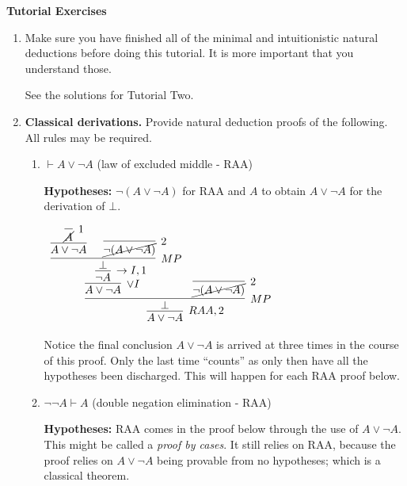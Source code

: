 \documentclass[11pt]{report}
\begin{document}
\newpage
{\bf Tutorial Exercises}
\begin{enumerate}

	\item Make sure you have finished all of the minimal and intuitionistic natural deductions before doing this tutorial. It is more important that you understand those.
	
	\hspace{0.2cm}{\bf Solution}
	
	See the solutions for Tutorial Two. 

	\item \textbf{Classical derivations.} Provide natural deduction proofs of the following. All rules may be required.
	
	\begin{enumerate}
		\item $\vdash   A \lor \neg A$ \hfill (law of excluded middle - RAA)
		
		\hspace{0.2cm}{\bf Solution}

		{\bf Hypotheses:} $\lnot(A \lor \lnot A)$ for RAA and $A$ to obtain $A \lor \lnot A$ for the derivation of $\bot$. 

		\begin{mdframed}
			\begin{center}
				$\begin{array}{c}
					\infer[RAA,2]{A \lor \lnot A}
						{\infer[MP]{\bot}
							{\infer[\lor I]{A \lor \lnot A}
								{\infer[\to I,1]{\lnot A}
									{\infer[MP]{\bot}
										{\infer[]{A \lor \lnot A}{\infer[1]{\cancel{A}}{}}
										&
										\infer[2]{\cancel{\lnot (A \lor \lnot A)}}{}}}}
							&
							\infer[2]{\cancel{\lnot(A \lor \lnot A)}}{}}}
				\end{array}$
			\end{center}
		\end{mdframed}

		Notice the final conclusion $A \lor \lnot A$ is arrived at three times in the course of this proof. Only the last time ``counts'' as only then have all the hypotheses been discharged. This will happen for each RAA proof below. 

		\item $\neg\neg A \vdash A$ \hfill (double negation elimination - RAA)
		
		\hspace{0.2cm}{\bf Solution}

		{\bf Hypotheses:} RAA comes in the proof below through the use of $A \lor \lnot A$. This might be called a \emph{proof by cases}. It still relies on RAA, because the proof relies on $A \lor \lnot A$ being provable from no hypotheses; which is a classical theorem. 


\end{enumerate}
\end{enumerate}
\end{document}
